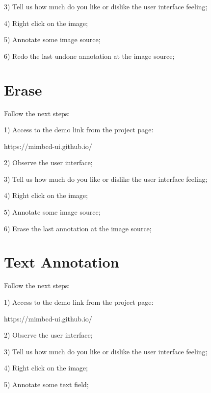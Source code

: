 \documentclass[a4paper, 11pt]{article}
\begin{document}
3) Tell us how much do you like or dislike the user interface feeling;

4) Right click on the image;

5) Annotate some image source;

6) Redo the last undone annotation at the image source;

\section*{Erase}

Follow the next steps:

1) Access to the demo link from the project page:

https://mimbcd-ui.github.io/

2) Observe the user interface;

3) Tell us how much do you like or dislike the user interface feeling;

4) Right click on the image;

5) Annotate some image source;

6) Erase the last annotation at the image source;

\section*{Text Annotation}

Follow the next steps:

1) Access to the demo link from the project page:

https://mimbcd-ui.github.io/

2) Observe the user interface;

3) Tell us how much do you like or dislike the user interface feeling;

4) Right click on the image;

5) Annotate some text field;


\end{document}
